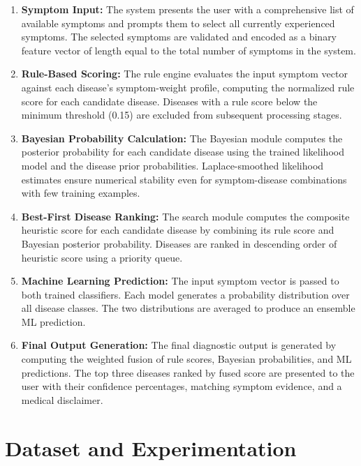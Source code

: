 \documentclass[12pt,a4paper]{article}
\begin{document}
\begin{enumerate}[leftmargin=1.5cm]
    \item \textbf{Symptom Input:} The system presents the user with a comprehensive list of available symptoms and prompts them to select all currently experienced symptoms. The selected symptoms are validated and encoded as a binary feature vector of length equal to the total number of symptoms in the system.

    \item \textbf{Rule-Based Scoring:} The rule engine evaluates the input symptom vector against each disease's symptom-weight profile, computing the normalized rule score for each candidate disease. Diseases with a rule score below the minimum threshold (0.15) are excluded from subsequent processing stages.

    \item \textbf{Bayesian Probability Calculation:} The Bayesian module computes the posterior probability for each candidate disease using the trained likelihood model and the disease prior probabilities. Laplace-smoothed likelihood estimates ensure numerical stability even for symptom-disease combinations with few training examples.

    \item \textbf{Best-First Disease Ranking:} The search module computes the composite heuristic score for each candidate disease by combining its rule score and Bayesian posterior probability. Diseases are ranked in descending order of heuristic score using a priority queue.

    \item \textbf{Machine Learning Prediction:} The input symptom vector is passed to both trained classifiers. Each model generates a probability distribution over all disease classes. The two distributions are averaged to produce an ensemble ML prediction.

    \item \textbf{Final Output Generation:} The final diagnostic output is generated by computing the weighted fusion of rule scores, Bayesian probabilities, and ML predictions. The top three diseases ranked by fused score are presented to the user with their confidence percentages, matching symptom evidence, and a medical disclaimer.
\end{enumerate}

\section{Dataset and Experimentation}
\end{document}
